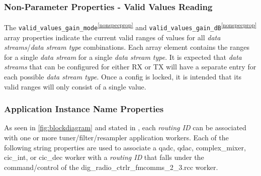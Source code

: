 \documentclass{article}
\def\comp{dig\_radio\_ctrlr\_fmcomms\_2\_3}
\begin{document}
  \subsubsection{Non-Parameter Properties - Valid Values Reading}
  The
  \verb+valid_values_gain_mode+\textsuperscript{\ref{nonspecprop}} and
  \verb+valid_values_gain_dB+\textsuperscript{\ref{nonspecprop}}
  array properties indicate the current valid ranges of
  values for all \textit{data streams}/\textit{data stream type}
  combinations. Each array element contains the
  ranges for a single \textit{data stream} for a single
  \textit{data stream type}.
  It is expected that \textit{data streams} that can be configured for either
  RX or TX will have a separate entry for each possible
  \textit{data stream type}.
  Once a config is locked, it
  is intended that its valid ranges will only consist of a single value.

  \begin{center}
  \end{center}

  \subsubsection{Application Instance Name Properties}
  As seen in \ref{fig:blockdiagram} and stated in
  \cite{dig_radio_ctrlr_comp_datasheet}, each \textit{routing ID}
  can be associated with one or more tuner/filter/resampler application workers.
  Each of the following string properties are used to associate a
  qadc, qdac, complex\_mixer, cic\_int, or cic\_dec worker
  with a \textit{routing ID} that falls under the command/control
  of the \comp{}.rcc worker.
\end{document}

